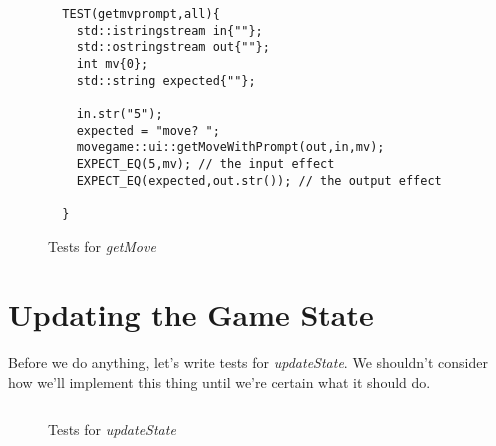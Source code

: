 \documentclass[nobib]{tufte-handout}
\begin{document}
\begin{figure}[!htbp]
\begin{lstlisting}
  TEST(getmvprompt,all){
    std::istringstream in{""};
    std::ostringstream out{""};
    int mv{0};
    std::string expected{""};

    in.str("5");
    expected = "move? ";
    movegame::ui::getMoveWithPrompt(out,in,mv);
    EXPECT_EQ(5,mv); // the input effect
    EXPECT_EQ(expected,out.str()); // the output effect
    
  }
\end{lstlisting}
\caption{Tests for \textit{getMove}}
\label{fig:getPrmt-tests}
\end{figure}


\section{Updating the Game State}

Before we do anything, let's write tests for \textit{updateState}. We shouldn't consider how we'll implement this thing until we're certain what it should do. 


\begin{figure}[!htbp]
\begin{lstlisting}

\end{lstlisting}
\caption{Tests for \textit{updateState}}
\label{fig:update-tests}
\end{figure}
\end{document}
